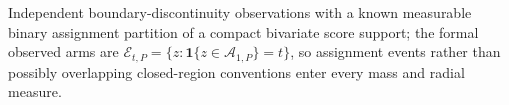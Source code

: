 Independent boundary-discontinuity observations with a known measurable binary assignment partition of a compact bivariate score support; the formal observed arms are \(\mathcal E_{t,P}=\{z:\mathbf1\{z\in\mathcal A_{1,P}\}=t\}\), so assignment events rather than possibly overlapping closed-region conventions enter every mass and radial measure.
